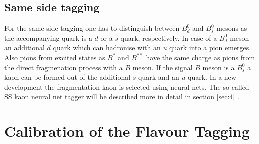 \documentclass{PoS}
\begin{document}
\subsection{Same side tagging}

For the same side tagging one has to distinguish between $B_d^0$ and $B_s^0$ mesons as the accompanying quark is a $d$ or a $s$ quark, respectively. In case of a $B_d^0$ meson an additional $d$ quark which can hadronise with an $u$ quark into a pion emerges. Also pions from excited states as $B^*$ and $B^{**}$ have the same charge as pions from the direct fragmenation process with a $B$ meson. If the signal $B$ meson is a $B_s^0$ a kaon can be formed out of the additional $s$ quark and an $u$ quark. In a new development the fragmentation kaon is selected using neural nets. The so called SS kaon neural net tagger will be described more in detail in section \ref{sec:4} \cite{2}.

\section{Calibration of the Flavour Tagging}\label{sec:3}
\end{document}
